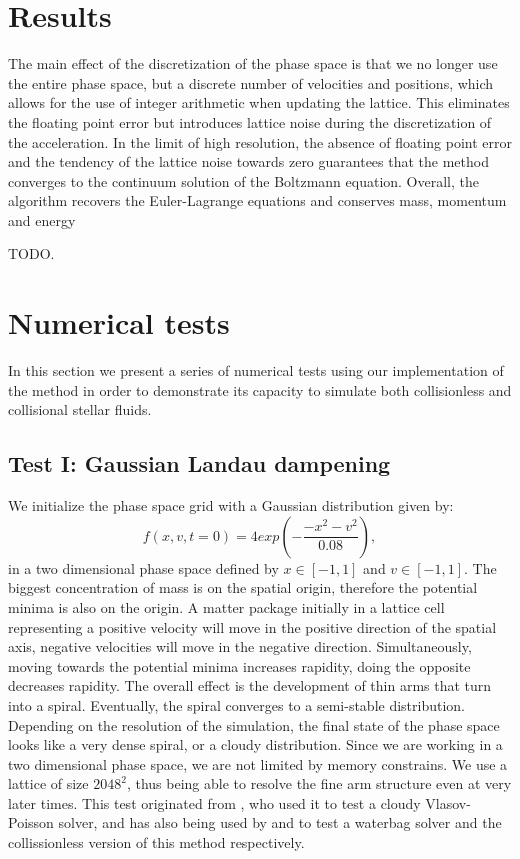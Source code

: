 \documentclass[fleqn,usenatbib]{mnras}
\begin{document}
\section{Results}
The main effect of the discretization of the phase space is that we no longer use the entire phase space, but a discrete number of velocities and positions, which allows for the use of integer arithmetic when updating the lattice. This eliminates the floating point error but introduces lattice noise during the discretization of the acceleration. In the limit of high resolution, the absence of floating point error and the tendency of the lattice noise towards zero guarantees that the method converges to the continuum solution of the Boltzmann equation. Overall, the algorithm recovers the Euler-Lagrange equations and conserves mass, momentum and energy

TODO.

\section{Numerical tests}
In this section we present a series of numerical tests using our implementation of the method in order to demonstrate its capacity to simulate both collisionless and collisional stellar fluids.   

\subsection{Test I: Gaussian Landau dampening}
\label{sec: test_gauss}
We initialize the phase space grid with a Gaussian distribution given by:
\begin{equation}
f(x,v,t = 0) = 4 exp(-\frac{-x^2-v^2}{0.08}),
\end{equation} 
in a two dimensional phase space defined by $x \in [-1,1]$ and $v \in [-1,1]$.
The biggest concentration of mass is on the spatial origin, therefore the potential minima is also on the origin.
A matter package initially in a lattice cell representing a positive velocity will move in the positive direction of the spatial axis, negative velocities will move in the negative direction.
Simultaneously, moving towards the potential minima increases rapidity, doing the opposite decreases rapidity.
The overall effect is the development of thin arms that turn into a spiral. Eventually, the spiral converges to a semi-stable distribution. Depending on the resolution of the simulation, the final state of the phase space looks like a very dense spiral, or a cloudy distribution.
Since we are working in a two dimensional phase space, we are not limited by memory constrains. We use a lattice of size $2048^2$, thus being able to resolve the fine arm structure even at very later times.
This test originated from \citet{2005MNRAS.359..123A}, who used it to test a cloudy Vlasov-Poisson solver, and has also being used by \citet{2014MNRAS.441.2414C} and \citet{integerLatticeDynamics} to test a waterbag solver and the collissionless version of this method respectively.
\end{document}
